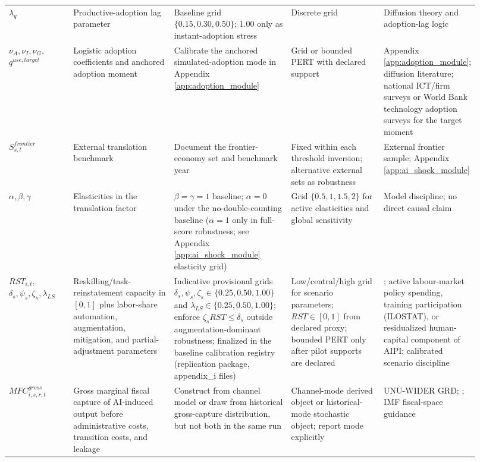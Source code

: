 \documentclass[11pt,a4paper]{article}
\begin{document}
\begin{landscape}
\begin{longtable}{@{}p{0.14\linewidth}p{0.22\linewidth}p{0.25\linewidth}p{0.20\linewidth}p{0.11\linewidth}@{}}
$\lambda_q$ & Productive-adoption lag parameter & Baseline grid $\{0.15,0.30,0.50\}$; $1.00$ only as instant-adoption stress & Discrete grid & Diffusion theory and adoption-lag logic \\
$\nu_A,\nu_I,\nu_G,$\newline $q^{use,target}$ & Logistic adoption coefficients and anchored adoption moment & Calibrate the anchored simulated-adoption mode in Appendix \ref{app:adoption_module} & Grid or bounded PERT with declared support & Appendix \ref{app:adoption_module}; diffusion literature; national ICT/firm surveys or World Bank technology adoption surveys for the target moment \\
$S^{frontier}_{s,t}$ & External translation benchmark & Document the frontier-economy set and benchmark year & Fixed within each threshold inversion; alternative external sets as robustness & External frontier sample; Appendix \ref{app:ai_shock_module} \\
$\alpha,\beta,\gamma$ & Elasticities in the translation factor & $\beta=\gamma=1$ baseline; $\alpha=0$ under the no-double-counting baseline ($\alpha=1$ only in full-score robustness; see Appendix \ref{app:ai_shock_module} elasticity grid) & Grid $\{0.5,1,1.5,2\}$ for active elasticities and global sensitivity & Model discipline; no direct causal claim \\
$RST_{i,t}$, $\delta_s,\psi_s,\zeta_s,$\newline $\lambda_{LS}$ & Reskilling/task-reinstatement capacity in $[0,1]$ plus labor-share automation, augmentation, mitigation, and partial-adjustment parameters & Indicative provisional grids $\delta_s,\psi_s,\zeta_s\in\{0.25,0.50,1.00\}$ and $\lambda_{LS}\in\{0.25,0.50,1.00\}$; enforce $\zeta_sRST\leq\delta_s$ outside augmentation-dominant robustness; finalized in the baseline calibration registry (replication package, appendix\_i files) & Low/central/high grid for scenario parameters; $RST\in[0,1]$ from declared proxy; bounded PERT only after pilot supports are declared & \citet{acemoglu2018race,acemoglu2019automation}; active labour-market policy spending, training participation (ILOSTAT), or residualized human-capital component of AIPI; calibrated scenario discipline \\
$MFC^{gross}_{i,s,r,t}$ & Gross marginal fiscal capture of AI-induced output before administrative costs, transition costs, and leakage & Construct from channel model or draw from historical gross-capture distribution, but not both in the same run & Channel-mode derived object or historical-mode stochastic object; report mode explicitly & UNU-WIDER GRD; \citet{brollo2024fiscal}; IMF fiscal-space guidance \\

\end{longtable}
\end{landscape}
\end{document}
